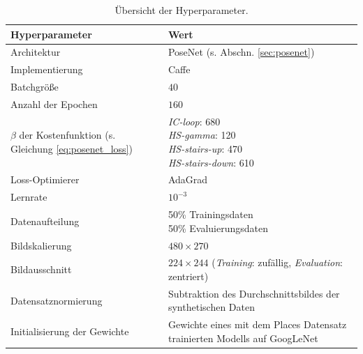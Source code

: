 \cleardoublepage
\begin{table}[bp]
	\centering
	\caption{Übersicht der Hyperparameter.}
	\begin{tabularx}{1.0\textwidth}{X X}
		\textbf{Hyperparameter} & \textbf{Wert}\\
		\hline
		Architektur & PoseNet (s. Abschn. \ref{sec:posenet})\\
		\hline
		Implementierung & Caffe \cite{jiaCaffeConvolutionalArchitecture2014} \\
		\hline
		Batchgröße & $40$\\
		\hline
		Anzahl der Epochen & $160$\\
		\hline
		\makecell[tl]{
			$\beta$ der Kostenfunktion\\
			(s. Gleichung \ref{eq:posenet_loss}) 
		} &
		\makecell[tl]{
			\textit{IC-loop}: 680\\
			\textit{HS-gamma}: 120\\
			\textit{HS-stairs-up}: 470\\
			\textit{HS-stairs-down}: 610\\
		}\\
		\hline
		Loss-Optimierer & AdaGrad\\
		\hline
		Lernrate & $10^{-3}$\\
		\hline
		Datenaufteilung & \makecell[tl]{
		   	50\% Trainingsdaten\\
			50\% Evaluierungsdaten\\
		}\\
		\hline
		Bildskalierung & $480 \times 270$\\
		\hline
		Bildausschnitt& \makecell[tl]{
			$224 \times 244$\\
			(\textit{Training}: zufällig, \textit{Evaluation}: zentriert)\\
		}\\
		\hline
		Datensatznormierung & Subtraktion des Durchschnittsbildes der synthetischen Daten \\
		\hline
		Initialisierung der Gewichte & Gewichte eines mit dem Places Datensatz trainierten Modells auf GoogLeNet \\
	\end{tabularx}
	\label{tab:trainingparams}
\end{table}
\cleardoublepage